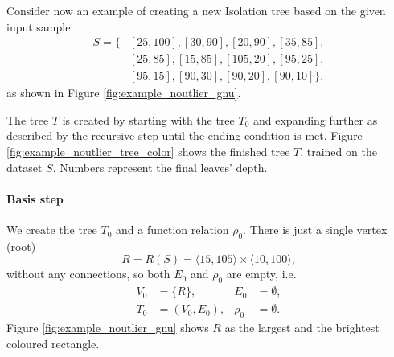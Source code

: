 \begin{example}
\label{example:original_tree_create}
Consider now an example of creating a new Isolation tree based on the given input sample
\begin{align*}
    S = \{&[25,100],[30,90],[20,90],[35,85],\\
    &[25,85],[15,85],[105,20],[95,25], \\
    &[95,15],[90,30],[90,20],[90,10]\},
\end{align*}
as shown in Figure \ref{fig:example_noutlier_gnu}.

\begin{figure*}[!t]
\centering

\caption{Original solution. Rectangles created by recursive splitting.}
\label{fig:example_noutlier_gnu}
\end{figure*}



The tree $T$ is created by starting with the tree $T_0$ and expanding further as described by the recursive step until the ending condition is met.
Figure \ref{fig:example_noutlier_tree_color} shows the finished tree $T$, trained on the dataset $S$. Numbers represent the final leaves’ depth.

\paragraph{Basis step} 
We create the tree $T_0$ and a function relation $\rho_0$.
   There is just a single vertex (root) 
   \[R = R(S) = \langle 15, 105 \rangle \times \langle 10, 100 \rangle,\]
   without any connections, so both $E_0$ and $\rho_0$ are empty, i.e.
\begin{align*}
V_0 &= \{R\},& E_0 &= \emptyset,\\
T_0 &= (V_0, E_0),& \rho_0 &= \emptyset.
\end{align*}
Figure \ref{fig:example_noutlier_gnu} shows $R$ as the largest and the brightest coloured rectangle.


\end{example}
